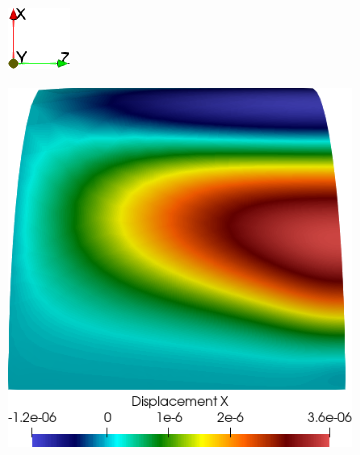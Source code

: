 \begin{figure}[h!]
    \centering
    \caption{Cilindro biengastado em problema estático - Campos de deslocamentos obtidos.}
    \begin{subfigure}{0.075\textwidth}
        \includegraphics[width=\linewidth]{Figuras/cylinder-shell/eixos.png}
    \end{subfigure}
    \begin{subfigure}{0.3\textwidth}
        \includegraphics[width=\linewidth]{Figuras/cylinder-shell/ux.png}

\end{subfigure}
\end{figure}
